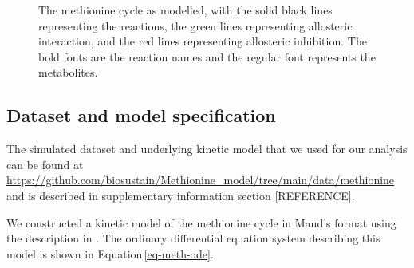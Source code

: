\documentclass[journal=asbcd6,manuscript=article,layout=traditional]{achemso}
\begin{document}
\begin{figure}

\begin{minipage}[t]{\linewidth}

{\centering 


}

\end{minipage}%

\caption{\label{fig-methionine-reactions}The methionine cycle as
modelled, with the solid black lines representing the reactions, the
green lines representing allosteric interaction, and the red lines
representing allosteric inhibition. The bold fonts are the reaction
names and the regular font represents the metabolites.}

\end{figure}

\hypertarget{dataset-and-model-specification}{%
\subsection{Dataset and model
specification}\label{dataset-and-model-specification}}

The simulated dataset and underlying kinetic model that we used for our
analysis can be found at
\url{https://github.com/biosustain/Methionine_model/tree/main/data/methionine}
and is described in supplementary information section {[}REFERENCE{]}.

We constructed a kinetic model of the methionine cycle in Maud's format
using the description in \citet{korendyaseva_allosteric_2008}. The
ordinary differential equation system describing this model is shown in
Equation\,\eqref{eq-meth-ode}.
\end{document}
